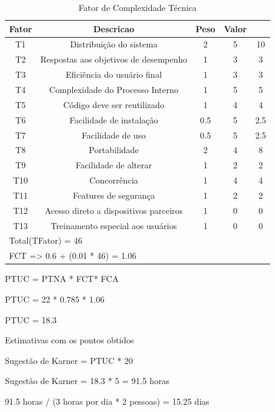 \begin{table}[!htb]
\caption[FCT]{Fator de Complexidade Técnica}
	\label{tab:correlacao}
	\centering
	\begin{tabular}{c|c|c|c|c}
		Fator & Descricao								   & Peso & Valor &     \\ \hline
		T1	  & Distribuição do sistema 				  				 & 2 	  &	  5   &	  10	  \\
		T2	  & Respostas aos objetivos de desempenho      & 1 	  &	  3   &	 	3  \\
		T3 	  & Eficiência do usuário final                & 1 	  &	  3   &		3	  \\
		T4 	  & Complexidade do Processo Interno           & 1 	  &	  5   &		5	  \\
		T5 	  & Código deve ser reutilizado                & 1 	  &	  4   &		4	  \\
		T6 	  & Facilidade de instalação                   & 0.5  &	  5   &		2.5	  \\
		T7 	  & Facilidade de uso                          & 0.5  &	  5   &		2.5	  \\
		T8 	  & Portabilidade                              & 2	  &	  4   &		8	  \\
		T9 	  & Facilidade de alterar                      & 1	  &	  2   &		2	  \\
		T10	  & Concorrência                               & 1	  &	  4   &		4	  \\
		T11	  & Features de segurança                      & 1	  &	  2   &		2	  \\
		T12	  & Acesso direto a dispositivos parceiros     & 1	  &	  0   &		0	  \\
		T13	  & Treinamento especial aos usuários          & 1	  &	  0   &		0	   \\ \hline
		\multicolumn{5}{l}{Total(TFator) = 46}\\ \hline
		\multicolumn{5}{l}{FCT => 0.6 + (0.01 * 46) = 1.06}\\
	\end{tabular}
\end{table}

PTUC = PTNA * FCT* FCA

PTUC = 22 * 0.785 * 1.06

PTUC = 18.3

Estimativas com os pontos obtidos

Sugestão de Karner = PTUC * 20

Sugestão de Karner = 18.3 * 5 = 91.5 horas

91.5 horas / (3 horas por dia * 2 pessoas) = 15.25 dias

